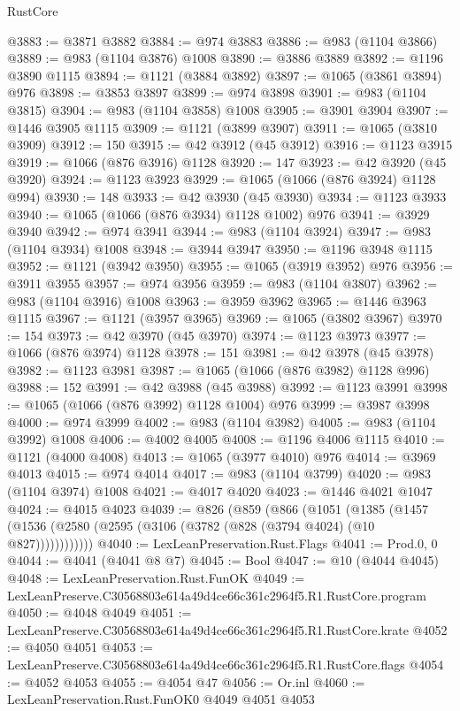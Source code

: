 \begin{lexlean}{RustCore}
\begin{coremodule}
@3883 := @3871 @3882
@3884 := @974 @3883
@3886 := @983 (@1104 @3866)
@3889 := @983 (@1104 @3876) @1008
@3890 := @3886 @3889
@3892 := @1196 @3890 @1115
@3894 := @1121 (@3884 @3892)
@3897 := @1065 (@3861 @3894) @976
@3898 := @3853 @3897
@3899 := @974 @3898
@3901 := @983 (@1104 @3815)
@3904 := @983 (@1104 @3858) @1008
@3905 := @3901 @3904
@3907 := @1446 @3905 @1115
@3909 := @1121 (@3899 @3907)
@3911 := @1065 (@3810 @3909)
@3912 := 150
@3915 := @42 @3912 (@45 @3912)
@3916 := @1123 @3915
@3919 := @1066 (@876 @3916) @1128
@3920 := 147
@3923 := @42 @3920 (@45 @3920)
@3924 := @1123 @3923
@3929 := @1065 (@1066 (@876 @3924) @1128 @994)
@3930 := 148
@3933 := @42 @3930 (@45 @3930)
@3934 := @1123 @3933
@3940 := @1065 (@1066 (@876 @3934) @1128 @1002) @976
@3941 := @3929 @3940
@3942 := @974 @3941
@3944 := @983 (@1104 @3924)
@3947 := @983 (@1104 @3934) @1008
@3948 := @3944 @3947
@3950 := @1196 @3948 @1115
@3952 := @1121 (@3942 @3950)
@3955 := @1065 (@3919 @3952) @976
@3956 := @3911 @3955
@3957 := @974 @3956
@3959 := @983 (@1104 @3807)
@3962 := @983 (@1104 @3916) @1008
@3963 := @3959 @3962
@3965 := @1446 @3963 @1115
@3967 := @1121 (@3957 @3965)
@3969 := @1065 (@3802 @3967)
@3970 := 154
@3973 := @42 @3970 (@45 @3970)
@3974 := @1123 @3973
@3977 := @1066 (@876 @3974) @1128
@3978 := 151
@3981 := @42 @3978 (@45 @3978)
@3982 := @1123 @3981
@3987 := @1065 (@1066 (@876 @3982) @1128 @996)
@3988 := 152
@3991 := @42 @3988 (@45 @3988)
@3992 := @1123 @3991
@3998 := @1065 (@1066 (@876 @3992) @1128 @1004) @976
@3999 := @3987 @3998
@4000 := @974 @3999
@4002 := @983 (@1104 @3982)
@4005 := @983 (@1104 @3992) @1008
@4006 := @4002 @4005
@4008 := @1196 @4006 @1115
@4010 := @1121 (@4000 @4008)
@4013 := @1065 (@3977 @4010) @976
@4014 := @3969 @4013
@4015 := @974 @4014
@4017 := @983 (@1104 @3799)
@4020 := @983 (@1104 @3974) @1008
@4021 := @4017 @4020
@4023 := @1446 @4021 @1047
@4024 := @4015 @4023
@4039 := @826
    (@859
      (@866
        (@1051
          (@1385 (@1457 (@1536 (@2580 (@2595 (@3106 (@3782 (@828 (@3794 @4024) (@10 @827))))))))))))
@4040 := LexLeanPreservation.Rust.Flags
@4041 := Prod.{0, 0}
@4044 := @4041 (@4041 @8 @7)
@4045 := Bool
@4047 := @10 (@4044 @4045)
@4048 := LexLeanPreservation.Rust.FunOK
@4049 := LexLeanPreserve.C30568803e614a49d4ce66c361c2964f5.R1.RustCore.program
@4050 := @4048 @4049
@4051 := LexLeanPreserve.C30568803e614a49d4ce66c361c2964f5.R1.RustCore.krate
@4052 := @4050 @4051
@4053 := LexLeanPreserve.C30568803e614a49d4ce66c361c2964f5.R1.RustCore.flags
@4054 := @4052 @4053
@4055 := @4054 @47
@4056 := Or.inl
@4060 := LexLeanPreservation.Rust.FunOK0 @4049 @4051 @4053

\end{coremodule}
\end{lexlean}
